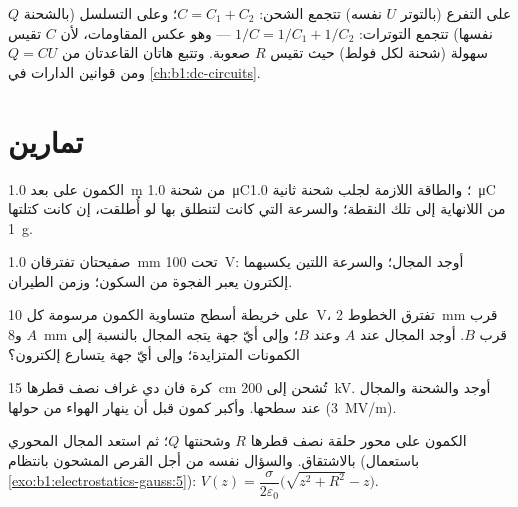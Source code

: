\begin{remark}\label{rem:b1:potential-capacitors:association}
على التفرع (بالتوتر $U$ نفسه) تتجمع الشحن: $C = C_1 + C_2$؛ وعلى التسلسل (بالشحنة
$Q$ نفسها) تتجمع التوترات: $1/C = 1/C_1 + 1/C_2$ --- وهو عكس
المقاومات، لأن $C$ تقيس سهولة (شحنة لكل فولط) حيث تقيس $R$
صعوبة. وتتبع هاتان القاعدتان من $Q = CU$ ومن
قوانين الدارات في \cref{ch:b1:dc-circuits}.
\end{remark}

\section{تمارين}

\begin{exercise}[$\star$]\label{exo:b1:potential-capacitors:1}
الكمون على بعد \qty{1.0}{m} من شحنة \qty{1.0}{\micro C}؛ والطاقة اللازمة
لجلب شحنة ثانية \qty{1.0}{\micro C} من اللانهاية إلى تلك النقطة؛ والسرعة
التي كانت لتنطلق بها لو أُطلقت، إن كانت كتلتها \qty{1}{g}.
\end{exercise}

\begin{exercise}[$\star$]\label{exo:b1:potential-capacitors:2}
صفيحتان تفترقان \qty{1.0}{mm} تحت \qty{100}{V}: أوجد المجال؛ 
والسرعة اللتين يكسبهما إلكترون يعبر الفجوة من السكون؛ وزمن
الطيران.
\end{exercise}

\begin{exercise}[$\star$]\label{exo:b1:potential-capacitors:3}
على خريطة أسطح متساوية الكمون مرسومة كل \qty{10}{V}، تفترق الخطوط
\qty{2}{mm} قرب $A$ و\qty{8}{mm} قرب $B$. أوجد المجال عند $A$
وعند $B$؛ وإلى أيّ جهة يتجه المجال بالنسبة إلى الكمونات
المتزايدة؛ وإلى أيّ جهة يتسارع إلكترون؟
\end{exercise}

\begin{exercise}[$\star$]\label{exo:b1:potential-capacitors:4}
كرة فان دي غراف نصف قطرها \qty{15}{cm} تُشحن إلى \qty{200}{kV}.
أوجد  والشحنة والمجال عند سطحها. وأكبر كمون قبل أن
ينهار الهواء من حولها (\qty{3}{MV/m}).
\end{exercise}

\begin{exercise}[$\star\star$]\label{exo:b1:potential-capacitors:5}
الكمون على محور حلقة نصف قطرها $R$ وشحنتها $Q$؛ ثم استعد
المجال المحوري بالاشتقاق. والسؤال نفسه من أجل القرص المشحون بانتظام
(باستعمال \cref{exo:b1:electrostatics-gauss:5}): $V(z) = \dfrac{\sigma}{2\varepsilon_0}
\bigl(\sqrt{z^2 + R^2} - z\bigr)$.
\end{exercise}

